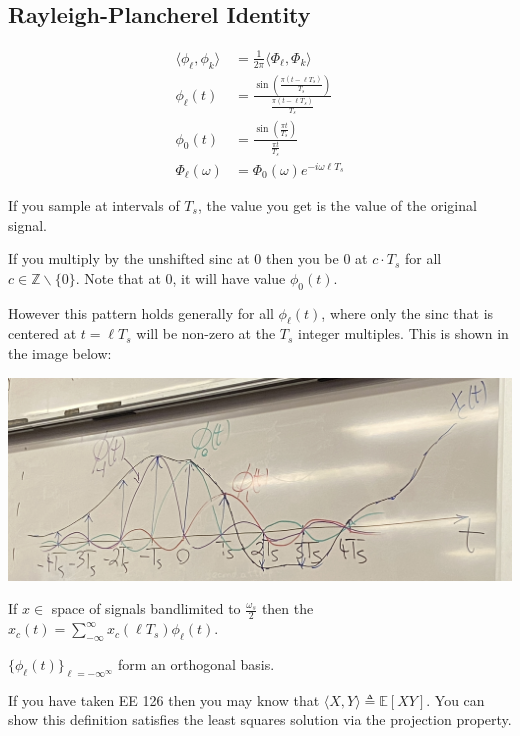 \subsection{Rayleigh-Plancherel Identity}
\begin{align*}
    \langle \phi_\ell, \phi_k \rangle
    &=
    \frac{1}{2\pi} \langle \Phi_\ell, \Phi_k \rangle
    \\
    \phi_\ell(t) 
    &= \frac{\sin\left(\frac{\pi(t-\ell T_s)}{T_s}\right)}{\frac{\pi(t-\ell T_s)}{T_s}}
    \\
    \phi_0(t) 
    &= \frac{\sin\left(\frac{\pi t}{T_s}\right)}{\frac{\pi t}{T_s}}
    \\
    \Phi_\mathbf{\ell}(\omega)
    &=
    \Phi_0(\omega) e^{-i\omega \mathbf{\ell} T_s}
\end{align*}

If you sample at intervals of $T_s$, the value you get is the value of the original signal.

If you multiply by the unshifted sinc at 0 then you be 0 at $c\cdot T_s$ for all $c\in\mathbb Z \backslash \{0\}$. Note that at $0$, it will have value $\phi_0(t)$.

However this pattern holds generally for all $\phi_\ell(t)$, where only the sinc that is centered at $t=\ell T_s$ will be non-zero at the $T_s$ integer multiples. This is shown in the image below:
\begin{center}
    \includegraphics[scale=0.115]{lectures/wk11/img/sinc.jpg}
\end{center}

If $x\in$ space of signals bandlimited to $\frac{\omega_s}{2}$ then the $x_c(t) = \displaystyle\sum_{-\infty}^\infty x_c(\ell T_s)\phi_\ell(t)$.

$\{\phi_\ell(t)\}_{\ell=-\infty^\infty}$ form an orthogonal basis.

If you have taken EE 126 then you may know that $\langle X, Y\rangle \triangleq \mathbb E[XY]$. You can show this definition satisfies the least squares solution via the projection property.

